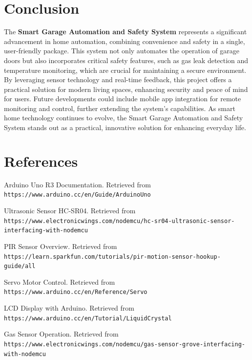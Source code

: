 \documentclass{article}
\begin{document}
\section{Conclusion}
The \textbf{Smart Garage Automation and Safety System} represents a significant advancement in home automation, combining convenience and safety in a single, user-friendly package. This system not only automates the operation of garage doors but also incorporates critical safety features, such as gas leak detection and temperature monitoring, which are crucial for maintaining a secure environment. By leveraging sensor technology and real-time feedback, this project offers a practical solution for modern living spaces, enhancing security and peace of mind for users. Future developments could include mobile app integration for remote monitoring and control, further extending the system's capabilities. As smart home technology continues to evolve, the Smart Garage Automation and Safety System stands out as a practical, innovative solution for enhancing everyday life.

\section{References}
\begin{enumerate}[label={[\arabic*]}]
    \item Arduino Uno R3 Documentation. Retrieved from \texttt{https://www.arduino.cc/en/Guide/ArduinoUno}
    \item Ultrasonic Sensor HC-SR04. Retrieved from \texttt{https://www.electronicwings.com/nodemcu/hc-sr04-ultrasonic-sensor-interfacing-with-nodemcu}
    \item PIR Sensor Overview. Retrieved from \texttt{https://learn.sparkfun.com/tutorials/pir-motion-sensor-hookup-guide/all}
    \item Servo Motor Control. Retrieved from \texttt{https://www.arduino.cc/en/Reference/Servo}
    \item LCD Display with Arduino. Retrieved from \texttt{https://www.arduino.cc/en/Tutorial/LiquidCrystal}
    \item Gas Sensor Operation. Retrieved from \texttt{https://www.electronicwings.com/nodemcu/gas-sensor-grove-interfacing-with-nodemcu}
\end{enumerate}
\end{document}
